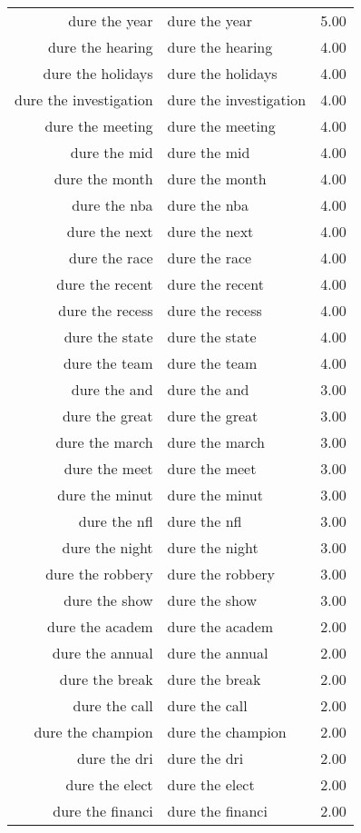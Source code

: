 \begin{table}[ht]
\begin{tabular}{rlr}
  dure the year & dure the year & 5.00 \\ 
  dure the hearing & dure the hearing & 4.00 \\ 
  dure the holidays & dure the holidays & 4.00 \\ 
  dure the investigation & dure the investigation & 4.00 \\ 
  dure the meeting & dure the meeting & 4.00 \\ 
  dure the mid & dure the mid & 4.00 \\ 
  dure the month & dure the month & 4.00 \\ 
  dure the nba & dure the nba & 4.00 \\ 
  dure the next & dure the next & 4.00 \\ 
  dure the race & dure the race & 4.00 \\ 
  dure the recent & dure the recent & 4.00 \\ 
  dure the recess & dure the recess & 4.00 \\ 
  dure the state & dure the state & 4.00 \\ 
  dure the team & dure the team & 4.00 \\ 
  dure the and & dure the and & 3.00 \\ 
  dure the great & dure the great & 3.00 \\ 
  dure the march & dure the march & 3.00 \\ 
  dure the meet & dure the meet & 3.00 \\ 
  dure the minut & dure the minut & 3.00 \\ 
  dure the nfl & dure the nfl & 3.00 \\ 
  dure the night & dure the night & 3.00 \\ 
  dure the robbery & dure the robbery & 3.00 \\ 
  dure the show & dure the show & 3.00 \\ 
  dure the academ & dure the academ & 2.00 \\ 
  dure the annual & dure the annual & 2.00 \\ 
  dure the break & dure the break & 2.00 \\ 
  dure the call & dure the call & 2.00 \\ 
  dure the champion & dure the champion & 2.00 \\ 
  dure the dri & dure the dri & 2.00 \\ 
  dure the elect & dure the elect & 2.00 \\ 
  dure the financi & dure the financi & 2.00 \\ 

\end{tabular}
\end{table}
